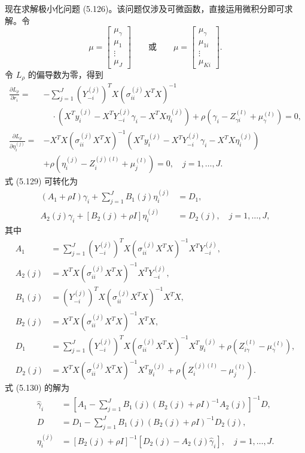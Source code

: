 现在求解极小化问题 (5.126)。该问题仅涉及可微函数，直接运用微积分即可求解。令
\[
\mu=\begin{bmatrix}\mu_\gamma\\\mu_1\\\vdots\\\mu_J\end{bmatrix}
\qquad\text{或}\qquad
\mu=\begin{bmatrix}\mu_\gamma\\\mu_{1i}\\\vdots\\\mu_{Ki}\end{bmatrix}.
\]
令 $L_\rho$ 的偏导数为零，得到
\begin{equation}
\begin{aligned}
\frac{\partial L_\rho}{\partial r_i}
={}&-\sum_{j=1}^J(Y_{-i}^{(j)})^TX(\sigma_{ii}^{(j)}X^TX)^{-1}\\
&\quad\cdot(X^Ty_i^{(j)}-X^TY_{-i}^{(j)}\gamma_i-X^TX\eta_i^{(j)})
+\rho(\gamma_i-Z_{\gamma i}^{(l)}+\mu_\gamma^{(l)})=0,\\
\frac{\partial L_\rho}{\partial\eta_i^{(j)}}
={}&-X^TX(\sigma_{ii}^{(j)}X^TX)^{-1}
(X^Ty_i^{(j)}-X^TY_{-i}^{(j)}\gamma_i-X^TX\eta_i^{(j)})\\
&+\rho(\eta_i^{(j)}-Z_i^{(j)(l)}+\mu_j^{(l)})=0,\quad j=1,\ldots,J.
\end{aligned}
\tag{5.129}
\end{equation}
式 (5.129) 可转化为
\begin{equation}
\begin{aligned}
(A_1+\rho I)\gamma_i+\sum_{j=1}^JB_1(j)\eta_i^{(j)}&=D_1,\\
A_2(j)\gamma_i+[B_2(j)+\rho I]\eta_i^{(j)}&=D_2(j),\quad j=1,\ldots,J,
\end{aligned}
\tag{5.130}
\end{equation}
其中
\[
\begin{aligned}
A_1&=\sum_{j=1}^J(Y_{-i}^{(j)})^TX(\sigma_{ii}^{(j)}X^TX)^{-1}X^TY_{-i}^{(j)},\\
A_2(j)&=X^TX(\sigma_{ii}^{(j)}X^TX)^{-1}X^TY_{-i}^{(j)},\\
B_1(j)&=(Y_{-i}^{(j)})^TX(\sigma_{ii}^{(j)}X^TX)^{-1}X^TX,\\
B_2(j)&=X^TX(\sigma_{ii}^{(j)}X^TX)^{-1}X^TX,\\
D_1&=\sum_{j=1}^J(Y_{-i}^{(j)})^TX(\sigma_{ii}^{(j)}X^TX)^{-1}X^Ty_i^{(j)}
+\rho(Z_{i\gamma}^{(l)}-\mu_\gamma^{(l)}),\\
D_2(j)&=X^TX(\sigma_{ii}^{(j)}X^TX)^{-1}X^Ty_i^{(j)}
+\rho(Z_i^{(j)(l)}-\mu_j^{(l)}).
\end{aligned}
\]
式 (5.130) 的解为
\begin{equation}
\begin{aligned}
\widehat\gamma_i&=\left[A_1-\sum_{j=1}^JB_1(j)(B_2(j)+\rho I)^{-1}A_2(j)\right]^{-1}D,\\
D&=D_1-\sum_{j=1}^JB_1(j)(B_2(j)+\rho I)^{-1}D_2(j),\\
\eta_i^{(j)}&=[B_2(j)+\rho I]^{-1}[D_2(j)-A_2(j)\widehat\gamma_i],\quad j=1,\ldots,J.
\end{aligned}
\tag{5.131}
\end{equation}

